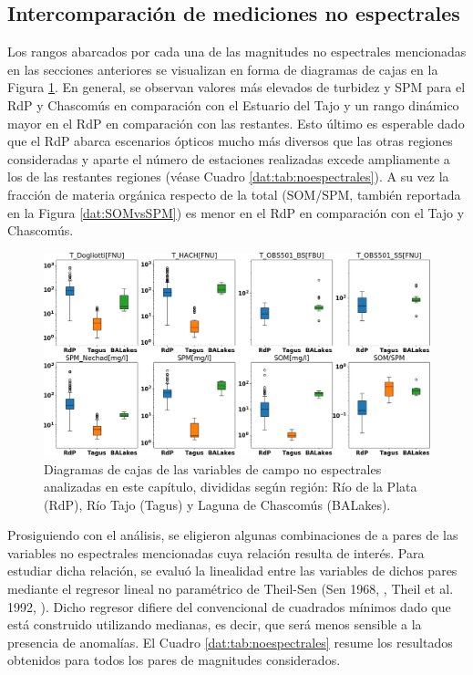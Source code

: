     \subsection{Intercomparación de mediciones no espectrales}
    \label{dat:s:noespectrales}
        
        Los rangos abarcados por cada una de las magnitudes no espectrales mencionadas en las secciones anteriores se visualizan en forma de diagramas de cajas en la Figura \ref{dat:boxplot}. En general, se observan valores más elevados de turbidez y SPM para el RdP y Chascomús en comparación con el Estuario del Tajo y un rango dinámico mayor en el RdP en comparación con las restantes. Esto último es esperable dado que el RdP abarca escenarios ópticos mucho más diversos que las otras regiones consideradas y aparte el número de estaciones realizadas excede ampliamente a los de las restantes regiones (véase Cuadro \ref{dat:tab:noespectrales}). A su vez la fracción de materia orgánica respecto de la total (SOM/SPM, también reportada en la Figura \ref{dat:SOMvsSPM}) es menor en el RdP en comparación con el Tajo y Chascomús.

        \begin{figure}
        \centering
        \includegraphics[width=\textwidth]{dat/figures/boxplot.png}
        \caption[Diagramas de cajas de las variables de campo no espectrales según región: Río de la Plata, Laguna de Chascomús y Río Tajo.]{Diagramas de cajas de las variables de campo no espectrales analizadas en este capítulo, divididas según región: Río de la Plata (RdP), Río Tajo (Tagus) y Laguna de Chascomús (BALakes).}
        \label{dat:boxplot}
        \end{figure}

        Prosiguiendo con el análisis, se eligieron algunas combinaciones de a pares de las variables no espectrales mencionadas cuya relación resulta de interés. Para estudiar dicha relación, se evaluó la linealidad entre las variables de dichos pares mediante el regresor lineal no paramétrico de Theil-Sen (Sen 1968, \cite{sen1968}, Theil et al. 1992, \cite{theil1992}). Dicho regresor difiere del convencional de cuadrados mínimos dado que está construido utilizando medianas, es decir, que será menos sensible a la presencia de anomalías. El Cuadro \ref{dat:tab:noespectrales} resume los resultados obtenidos para todos los pares de magnitudes considerados.


